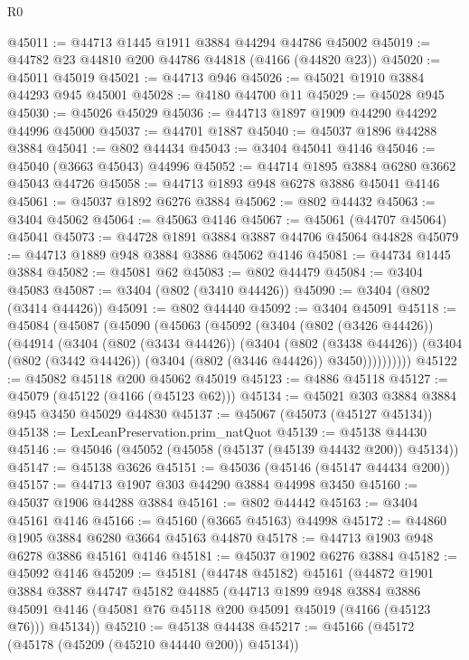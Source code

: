 \begin{lexlean}{R0}
\begin{coremodule}
@45011 := @44713 @1445 @1911 @3884 @44294 @44786 @45002
@45019 := @44782 @23 @44810 @200 @44786 @44818 (@4166 (@44820 @23))
@45020 := @45011 @45019
@45021 := @44713 @946
@45026 := @45021 @1910 @3884 @44293 @945 @45001
@45028 := @4180 @44700 @11
@45029 := @45028 @945
@45030 := @45026 @45029
@45036 := @44713 @1897 @1909 @44290 @44292 @44996 @45000
@45037 := @44701 @1887
@45040 := @45037 @1896 @44288 @3884
@45041 := @802 @44434
@45043 := @3404 @45041 @4146
@45046 := @45040 (@3663 @45043) @44996
@45052 := @44714 @1895 @3884 @6280 @3662 @45043 @44726
@45058 := @44713 @1893 @948 @6278 @3886 @45041 @4146
@45061 := @45037 @1892 @6276 @3884
@45062 := @802 @44432
@45063 := @3404 @45062
@45064 := @45063 @4146
@45067 := @45061 (@44707 @45064) @45041
@45073 := @44728 @1891 @3884 @3887 @44706 @45064 @44828
@45079 := @44713 @1889 @948 @3884 @3886 @45062 @4146
@45081 := @44734 @1445 @3884
@45082 := @45081 @62
@45083 := @802 @44479
@45084 := @3404 @45083
@45087 := @3404 (@802 (@3410 @44426))
@45090 := @3404 (@802 (@3414 @44426))
@45091 := @802 @44440
@45092 := @3404 @45091
@45118 := @45084
    (@45087
      (@45090
        (@45063
          (@45092
            (@3404
              (@802 (@3426 @44426))
              (@44914
                (@3404
                  (@802 (@3434 @44426))
                  (@3404
                    (@802 (@3438 @44426))
                    (@3404 (@802 (@3442 @44426)) (@3404 (@802 (@3446 @44426)) @3450))))))))))
@45122 := @45082 @45118 @200 @45062 @45019
@45123 := @4886 @45118
@45127 := @45079 (@45122 (@4166 (@45123 @62)))
@45134 := @45021 @303 @3884 @3884 @945 @3450 @45029 @44830
@45137 := @45067 (@45073 (@45127 @45134))
@45138 := LexLeanPreservation.prim_natQuot
@45139 := @45138 @44430
@45146 := @45046 (@45052 (@45058 (@45137 (@45139 @44432 @200)) @45134))
@45147 := @45138 @3626
@45151 := @45036 (@45146 (@45147 @44434 @200))
@45157 := @44713 @1907 @303 @44290 @3884 @44998 @3450
@45160 := @45037 @1906 @44288 @3884
@45161 := @802 @44442
@45163 := @3404 @45161 @4146
@45166 := @45160 (@3665 @45163) @44998
@45172 := @44860 @1905 @3884 @6280 @3664 @45163 @44870
@45178 := @44713 @1903 @948 @6278 @3886 @45161 @4146
@45181 := @45037 @1902 @6276 @3884
@45182 := @45092 @4146
@45209 := @45181
    (@44748 @45182)
    @45161
    (@44872
      @1901
      @3884
      @3887
      @44747
      @45182
      @44885
      (@44713
        @1899
        @948
        @3884
        @3886
        @45091
        @4146
        (@45081 @76 @45118 @200 @45091 @45019 (@4166 (@45123 @76)))
        @45134))
@45210 := @45138 @44438
@45217 := @45166 (@45172 (@45178 (@45209 (@45210 @44440 @200)) @45134))

\end{coremodule}
\end{lexlean}
